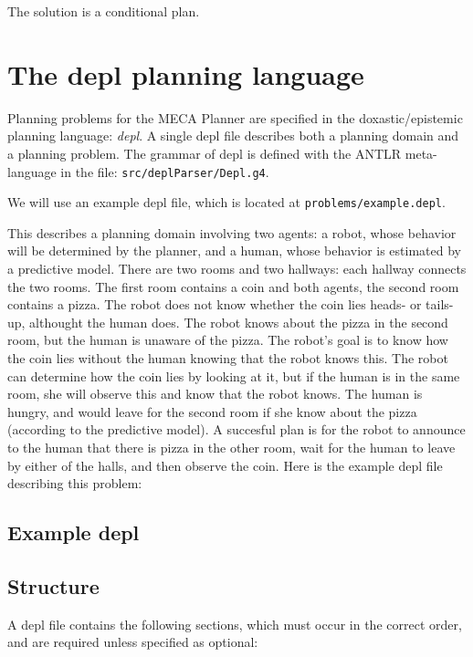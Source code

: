 \documentclass{article}
\begin{document}
The solution is a conditional plan.

\section{The depl planning language}

Planning problems for the MECA Planner are specified in the doxastic/epistemic
planning language: \emph{depl}. A single depl file describes both a planning domain
and a planning problem.
The grammar of depl is defined with the ANTLR meta-language in the file:
\texttt{src/deplParser/Depl.g4}.

We will use an example depl file, which is located at 
\texttt{problems/example.depl}.

This describes a planning domain involving two agents: a robot, whose behavior
will be determined by the planner, and a human, whose behavior is
estimated by a predictive model. There are two rooms and two hallways: each
hallway connects the two rooms. The first room contains a coin and both agents,
the second room contains a pizza. The robot does not know whether the coin lies
heads- or tails-up, althought the human does. The robot knows about the pizza in
the second room, but the human is unaware of the pizza.
The robot's goal is to know how the coin lies without the human knowing that the
robot knows this.
The robot can determine
how the coin lies by looking at it, but if the human is in the same room, she
will observe this and know that the robot knows. The human is hungry, and would
leave for the second room if she know about the pizza (according to the
predictive model).
A succesful plan is for the robot to announce to the human that there is pizza
in the other room, wait for the human to leave by either of the halls, and then
observe the coin. Here is the example depl file describing this problem:

\subsection{Example depl}





\subsection{Structure}

A depl file contains the following sections, which must occur in the correct
order, and are required unless specified as optional:
\end{document}
